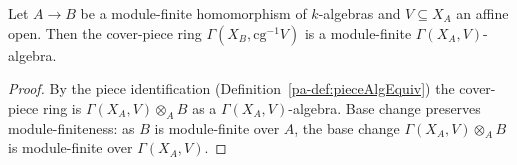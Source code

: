 \begin{lemma}
  \label{pa-lem:finite_pieceCover}
  \leanok

  Let \(A \to B\) be a module-finite homomorphism of \(k\)-algebras and \(V \subseteq X_A\) an affine
  open. Then the cover-piece ring \(\Gamma(X_B, \mathrm{cg}^{-1}V)\) is a module-finite \(\Gamma(X_A,
  V)\)-algebra.
\end{lemma}
\begin{proof}
  \leanok
  By the piece identification (Definition~\ref{pa-def:pieceAlgEquiv}) the cover-piece ring is \(\Gamma(
  X_A, V) \otimes_A B\) as a \(\Gamma(X_A, V)\)-algebra. Base change preserves module-finiteness: as
  \(B\) is module-finite over \(A\), the base change \(\Gamma(X_A, V) \otimes_A B\) is module-finite
  over \(\Gamma(X_A, V)\).
\end{proof}

